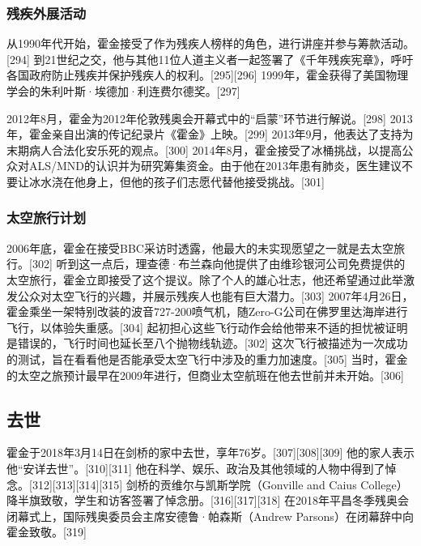 \subsubsection{残疾外展活动}
从1990年代开始，霍金接受了作为残疾人榜样的角色，进行讲座并参与筹款活动。[294] 到21世纪之交，他与其他11位人道主义者一起签署了《千年残疾宪章》，呼吁各国政府防止残疾并保护残疾人的权利。[295][296] 1999年，霍金获得了美国物理学会的朱利叶斯·埃德加·利连费尔德奖。[297]

2012年8月，霍金为2012年伦敦残奥会开幕式中的“启蒙”环节进行解说。[298] 2013年，霍金亲自出演的传记纪录片《霍金》上映。[299] 2013年9月，他表达了支持为末期病人合法化安乐死的观点。[300] 2014年8月，霍金接受了冰桶挑战，以提高公众对ALS/MND的认识并为研究筹集资金。由于他在2013年患有肺炎，医生建议不要让冰水浇在他身上，但他的孩子们志愿代替他接受挑战。[301]
\subsubsection{太空旅行计划}
2006年底，霍金在接受BBC采访时透露，他最大的未实现愿望之一就是去太空旅行。[302] 听到这一点后，理查德·布兰森向他提供了由维珍银河公司免费提供的太空旅行，霍金立即接受了这个提议。除了个人的雄心壮志，他还希望通过此举激发公众对太空飞行的兴趣，并展示残疾人也能有巨大潜力。[303] 2007年4月26日，霍金乘坐一架特别改装的波音727-200喷气机，随Zero-G公司在佛罗里达海岸进行飞行，以体验失重感。[304] 起初担心这些飞行动作会给他带来不适的担忧被证明是错误的，飞行时间也延长至八个抛物线轨迹。[302] 这次飞行被描述为一次成功的测试，旨在看看他是否能承受太空飞行中涉及的重力加速度。[305] 当时，霍金的太空之旅预计最早在2009年进行，但商业太空航班在他去世前并未开始。[306]
\subsection{去世}
霍金于2018年3月14日在剑桥的家中去世，享年76岁。[307][308][309] 他的家人表示他“安详去世”。[310][311] 他在科学、娱乐、政治及其他领域的人物中得到了悼念。[312][313][314][315] 剑桥的贡维尔与凯斯学院（Gonville and Caius College）降半旗致敬，学生和访客签署了悼念册。[316][317][318] 在2018年平昌冬季残奥会闭幕式上，国际残奥委员会主席安德鲁·帕森斯（Andrew Parsons）在闭幕辞中向霍金致敬。[319]

